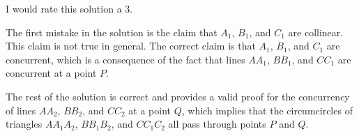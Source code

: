 I would rate this solution a 3.

The first mistake in the solution is the claim that $A_1$, $B_1$, and $C_1$ are collinear. This claim is not true in general. The correct claim is that $A_1$, $B_1$, and $C_1$ are concurrent, which is a consequence of the fact that lines $AA_1$, $BB_1$, and $CC_1$ are concurrent at a point $P$. 

The rest of the solution is correct and provides a valid proof for the concurrency of lines $AA_2$, $BB_2$, and $CC_2$ at a point $Q$, which implies that the circumcircles of triangles $AA_1A_2$, $BB_1B_2$, and $CC_1C_2$ all pass through points $P$ and $Q$.
